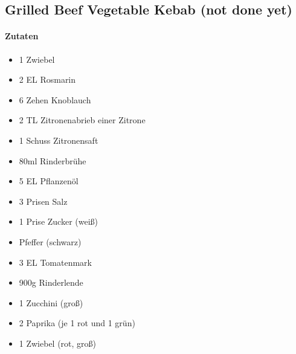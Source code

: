 \newpage
\subsection{Grilled Beef Vegetable Kebab (not done yet)}
\paragraph{Zutaten}
\begin{itemize}[noitemsep]
	\item 1 Zwiebel
	\item 2 EL Rosmarin 
	\item 6 Zehen Knoblauch
	\item 2 TL Zitronenabrieb einer Zitrone
	\item 1 Schuss Zitronensaft
	\item 80ml Rinderbrühe
	\item 5 EL Pflanzenöl
	\item 3 Prisen Salz 
	\item 1 Prise Zucker (weiß)
	\item Pfeffer (schwarz)
	\item 3 EL Tomatenmark
	\vspace{0.5cm}
	\item 900g Rinderlende
	\item 1 Zucchini (groß)
	\item 2 Paprika (je 1 rot und 1 grün)
	\item 1 Zwiebel (rot, groß)
\end{itemize}

